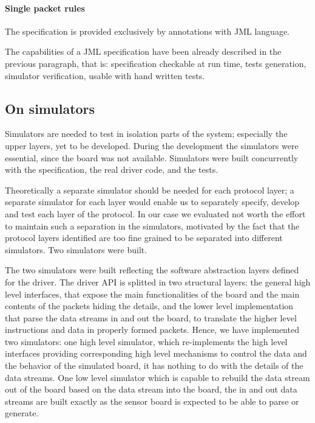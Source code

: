 \documentclass{article} \usepackage{times}
\begin{document}
\paragraph{Single packet rules}

The specification is provided exclusively by annotations with JML
language.

The capabilities of a JML specification have been already described in
the previous paragraph, that is: specification checkable at run time,
tests generation, simulator verification, usable with hand written
tests.

\subsection{On simulators}
\label{subsec:on_simulators}

Simulators are needed to test in isolation parts of the system;
especially the upper layers, yet to be developed.  During the
development the simulators were essential, since the board was not
available.  Simulators were built concurrently with the specification,
the real driver code, and the tests.

Theoretically a separate simulator should be needed for each protocol
layer; a separate simulator for each layer would enable us to
separately specify, develop and test each layer of the protocol.  In
our case we evaluated not worth the effort to maintain such a
separation in the simulators, motivated by the fact that the protocol
layers identified are too fine grained to be separated into different
simulators.  Two simulators were built.

The two simulators were built reflecting the software abstraction
layers defined for the driver.  The driver API is splitted in two
structural layers: the general high level interfaces, that expose the
main functionalities of the board and the main contents of the packets
hiding the details, and the lower level implementation that parse the
data streams in and out the board, to translate the higher level
instructions and data in properly formed packets.  Hence, we have
implemented two simulators: one high level simulator, which
re-implements the high level interfaces providing corresponding high
level mechanisms to control the data and the behavior of the simulated
board, it has nothing to do with the details of the data streams.  One
low level simulator which is capable to rebuild the data stream out of
the board based on the data stream into the board, the in and out data
streams are built exactly as the sensor board is expected to be able
to parse or generate.
\end{document}
